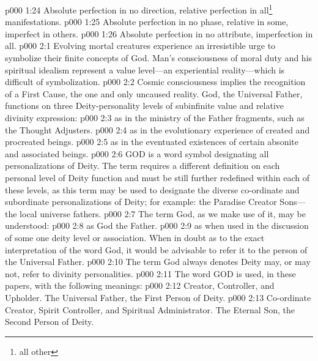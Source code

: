 \vs p000 1:24 \bibnobreakspace Absolute perfection in no direction, relative perfection in all\footnote{all other} manifestations.
\vs p000 1:25 \bibnobreakspace Absolute perfection in no phase, relative in some, imperfect in others.
\vs p000 1:26 \bibnobreakspace Absolute perfection in no attribute, imperfection in all.
\vs p000 2:1 Evolving mortal creatures experience an irresistible urge to symbolize their finite concepts of God. Man’s consciousness of moral duty and his spiritual idealism represent a value level---an experiential reality---which is difficult of symbolization.
\vs p000 2:2 Cosmic consciousness implies the recognition of a First Cause, the one and only uncaused reality. God, the Universal Father, functions on three Deity\hyp{}personality levels of subinfinite value and relative divinity expression:
\pc \vs p000 2:3 \bibnobreakspace {}as in the ministry of the Father fragments, such as the Thought Adjusters.
\vs p000 2:4 \bibnobreakspace {}as in the evolutionary experience of created and procreated beings.
\vs p000 2:5 \bibnobreakspace {}as in the eventuated existences of certain absonite and associated beings.
\vs p000 2:6 GOD is a word symbol designating all personalizations of Deity. The term requires a different definition on each personal level of Deity function and must be still further redefined within each of these levels, as this term may be used to designate the diverse co\hyp{}ordinate and subordinate personalizations of Deity; for example: the Paradise Creator Sons---the local universe fathers.
\pc \vs p000 2:7 The term God, as we make use of it, may be understood:
\vs p000 2:8 as God the Father.
\vs p000 2:9 as when used in the discussion of some one deity level or association. When in doubt as to the exact interpretation of the word God, it would be advisable to refer it to the person of the Universal Father.
\pc \vs p000 2:10 The term God always denotes  Deity may, or may not, refer to divinity personalities.
\pc \vs p000 2:11 The word GOD is used, in these papers, with the following meanings:
\pc \vs p000 2:12 \bibnobreakspace {}Creator, Controller, and Upholder. The Universal Father, the First Person of Deity.
\vs p000 2:13 \bibnobreakspace {}Co\hyp{}ordinate Creator, Spirit Controller, and Spiritual Administrator. The Eternal Son, the Second Person of Deity.
